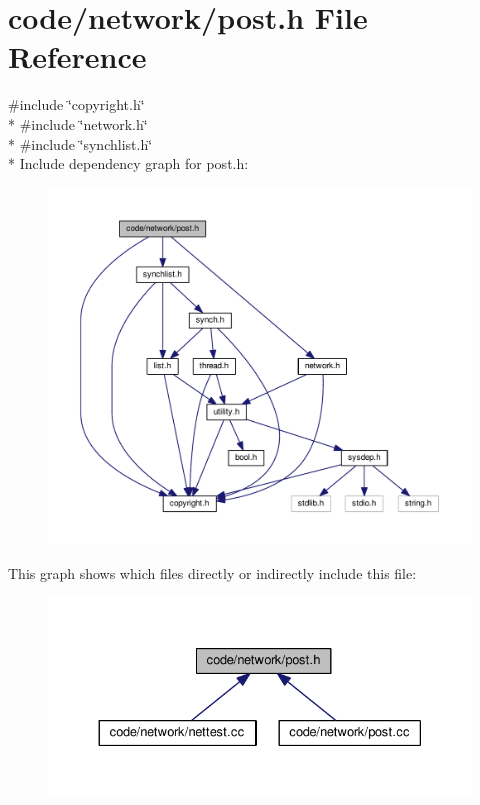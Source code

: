 \section{code/network/post.h File Reference}
\label{post_8h}
{\ttfamily \#include \char`\"{}copyright.\+h\char`\"{}}\\*
{\ttfamily \#include \char`\"{}network.\+h\char`\"{}}\\*
{\ttfamily \#include \char`\"{}synchlist.\+h\char`\"{}}\\*
Include dependency graph for post.\+h\+:
\nopagebreak
\begin{figure}[H]
\begin{center}
\leavevmode
\includegraphics[width=350pt]{post_8h__incl}
\end{center}
\end{figure}
This graph shows which files directly or indirectly include this file\+:
\nopagebreak
\begin{figure}[H]
\begin{center}
\leavevmode
\includegraphics[width=330pt]{post_8h__dep__incl}
\end{center}
\end{figure}
